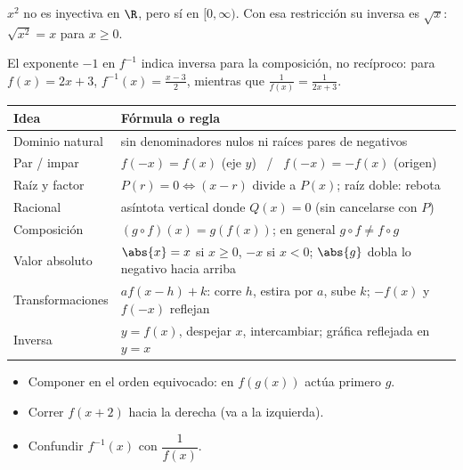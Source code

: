 \documentclass[11pt,a4paper]{article}
\begin{document}
\begin{ejemplo}
$x^2$ no es inyectiva en $\R$, pero sí en $[0,\infty)$. Con esa restricción su inversa es $\sqrt{x}$:
$\sqrt{x^2}=x$ para $x\ge0$.
\end{ejemplo}

\begin{ojo}[$f^{-1}$ no es $1/f$]
El exponente $-1$ en $f^{-1}$ indica inversa para la composición, no recíproco: para $f(x)=2x+3$,
$f^{-1}(x)=\frac{x-3}{2}$, mientras que $\frac{1}{f(x)}=\frac{1}{2x+3}$.
\end{ojo}

\repaso
\begin{center}
\begin{tabularx}{\linewidth}{@{}l L@{}}
\toprule
Idea & Fórmula o regla\\ \midrule
Dominio natural & sin denominadores nulos ni raíces pares de negativos\\
Par / impar & $f(-x)=f(x)$ (eje $y$) \ / \ $f(-x)=-f(x)$ (origen)\\
Raíz y factor & $P(r)=0\iff(x-r)$ divide a $P(x)$; raíz doble: rebota\\
Racional & asíntota vertical donde $Q(x)=0$ (sin cancelarse con $P$)\\
Composición & $(g\circ f)(x)=g(f(x))$; en general $g\circ f\ne f\circ g$\\
Valor absoluto & $\abs{x}=x$ si $x\ge0$, $-x$ si $x<0$; $\abs{g}$ dobla lo negativo hacia arriba\\
Transformaciones & $af(x-h)+k$: corre $h$, estira por $a$, sube $k$; $-f(x)$ y $f(-x)$ reflejan\\
Inversa & $y=f(x)$, despejar $x$, intercambiar; gráfica reflejada en $y=x$\\
\bottomrule
\end{tabularx}
\end{center}

\begin{ojo}
\begin{itemize}
\item Componer en el orden equivocado: en $f(g(x))$ actúa primero $g$.
\item Correr $f(x+2)$ hacia la derecha (va a la izquierda).
\item Confundir $f^{-1}(x)$ con $\dfrac{1}{f(x)}$.
\end{itemize}
\end{ojo}
\end{document}
